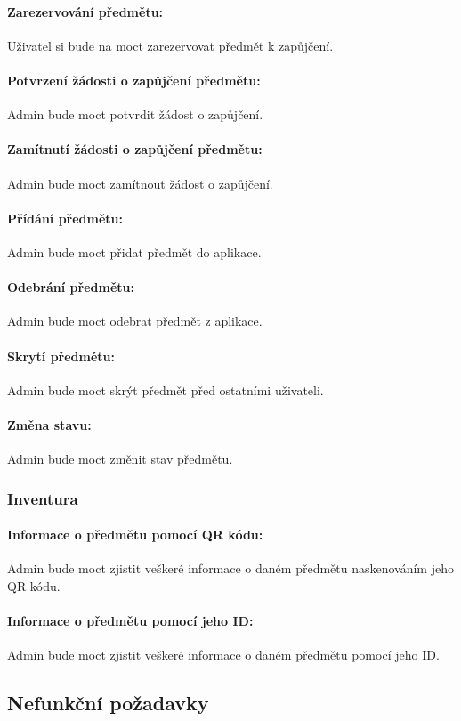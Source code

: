 \documentclass[12pt, a4paper]{article}
\begin{document}
\paragraph{Zarezervování předmětu:}
Uživatel si bude na moct zarezervovat předmět k zapůjčení.
\paragraph{Potvrzení žádosti o zapůjčení předmětu:}
Admin bude moct potvrdit žádost o zapůjčení.
\paragraph{Zamítnutí žádosti o zapůjčení předmětu:}
Admin bude moct zamítnout žádost o zapůjčení.
\paragraph{Přídání předmětu:}
Admin bude moct přidat předmět do aplikace.
\paragraph{Odebrání předmětu:}
Admin bude moct odebrat předmět z aplikace.
\paragraph{Skrytí předmětu:}
Admin bude moct skrýt předmět před ostatními uživateli.
\paragraph{Změna stavu:}
Admin bude moct změnit stav předmětu.
\subsubsection{Inventura}
\paragraph{Informace o předmětu pomocí QR kódu:}Admin bude moct zjistit veškeré informace o daném předmětu naskenováním jeho QR kódu.
\paragraph{Informace o předmětu pomocí jeho ID:}Admin bude moct zjistit veškeré informace o daném předmětu pomocí jeho ID.
\subsection{Nefunkční požadavky}
\end{document}
